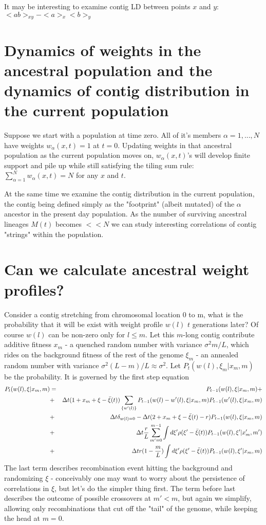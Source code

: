 \documentclass{article}
\begin{document}
It may be interesting to examine contig LD between points $x$ and $y$: $<ab>_{xy} -<a>_x<b>_y$

\section{Dynamics of weights in the ancestral population and the dynamics of contig distribution in the current population}
Suppose we start with a population at time zero. All of it's members $\alpha=1,...,N$ have weights $w_{\alpha}(x,t)=1$ at $t=0$. Updating weights in that ancestral population as the current population moves on, $w_{\alpha}(x,t)$'s will develop finite support and pile up while still satisfying the tiling sum rule: $\sum_{\alpha=1}^N w_{\alpha}(x,t)=N$ for any $x$ and $t$.

At the same time we examine the contig distribution in the current population, the contig being defined simply as the "footprint" (albeit mutated) of the $\alpha$ ancestor in the present day population. As the number of surviving ancestral lineages $M(t)$ becomes $<<N$ we can study interesting correlations
of contig "strings" within the population.

\section{Can we calculate ancestral weight profiles?}
Consider a contig stretching from chromosomal location 0 to m, what is the probability that it will be exist with weight profile $w(l)$  $t$ generations later? Of course $w(l)$ can be non-zero only for $l \le m$. Let this $m$-long contig contribute additive fitness $x_m$ - a quenched random number with variance $\sigma^2 m/L$, which rides on the background fitness of the rest of the genome $\xi_m$ - an annealed random number with variance $\sigma^2 (L-m)/L \approx \sigma^2$. Let  $P_t (w(l),\xi_m | x_m,m)$ be the probability. It is governed by the first step equation
\begin{eqnarray}
P_t (w(l),\xi | x_m,m)&=& P_{t-1} (w(l),\xi | x_m,m)+\\
&+&\Delta t (1+x_m+\xi-{\bar \xi}(t)) \sum_{\{w'(l)\}} P_{t-1} (w(l)-w'(l),\xi | x_m,m)P_{t-1} (w'(l),\xi | x_m,m)\\
&+&\Delta t \delta_{w(l)=0}-\Delta t (2+x_m+\xi-{\bar \xi}(t)-r) P_{t-1} (w(l),\xi | x_m,m)\\
&+&\Delta t {r \over L}  \sum_{m'=0}^{m-1}  \int d\xi' \rho(\xi'-{\bar \xi}(t)) P_{t-1} (w(l),\xi' | x_m',m')\\
&+&\Delta t r (1-{m \over L}) \int d\xi' \rho(\xi'-{\bar \xi}(t)) P_{t-1} (w(l),\xi' | x_m,m)
\end{eqnarray}
The last term describes recombination event hitting the background and randomizing $\xi$ - conceivably one may want to worry about the persistence of correlations in $\xi$, but let's do the simpler thing first. The term before last describes the outcome of possible crossovers at $m'<m$, but again we simplify, allowing only recombinations that cut off the "tail" of the genome, while keeping the head at $m=0$.
\end{document}

